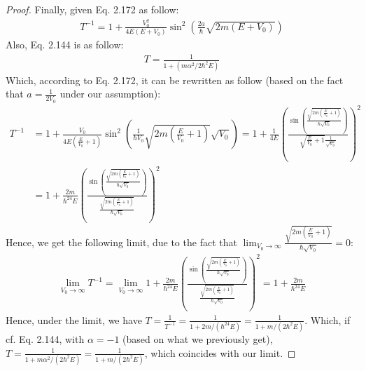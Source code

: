 \documentclass{article}
\begin{document}
\begin{proof}
    Finally, given Eq. 2.172 as follow:
    \begin{align}
        T^{-1}=1+\frac{V_0^2}{4E(E+V_0)}\sin^2\left(\frac{2a}{\hbar}\sqrt{2m(E+V_0)}\right)
    \end{align}
    Also, Eq. 2.144 is as follow:
    \begin{align}
        T=\frac{1}{1+(m\alpha^2/2\hbar^2E)}
    \end{align}
    Which, according to Eq. 2.172, it can be rewritten as follow (based on the fact that $a=\frac{1}{2V_0}$ under our assumption):
    \begin{align}
        T^{-1} &= 1+\frac{V_0}{4E(\frac{E}{V_0}+1)}\sin^2\left(\frac{1}{\hbar V_0}\sqrt{2m\left(\frac{E}{V_0}+1\right)}\sqrt{V_0}\right) = 1+\frac{1}{4E}\left(\frac{\sin\left(\frac{\sqrt{2m(\frac{E}{V_0}+1)}}{\hbar\sqrt{V_0}}\right)}{\sqrt{\frac{E}{V_0}+1}\frac{1}{\sqrt{V_0}}}\right)^2\\
        &= 1+\frac{2m}{\hbar^24E}\left(\frac{\sin\left(\frac{\sqrt{2m(\frac{E}{V_0}+1)}}{\hbar\sqrt{V_0}}\right)}{\frac{\sqrt{2m(\frac{E}{V_0}+1)}}{\hbar\sqrt{V_0}}}\right)^2
    \end{align}
    Hence, we get the following limit, due to the fact that $\lim_{V_0\rightarrow\infty}\frac{\sqrt{2m(\frac{E}{V_0}+1)}}{\hbar\sqrt{V_0}} = 0$:
    \begin{align}
        \lim_{V_0\rightarrow\infty}T^{-1}=\lim_{V_0\rightarrow\infty}1+\frac{2m}{\hbar^24E}\left(\frac{\sin\left(\frac{\sqrt{2m(\frac{E}{V_0}+1)}}{\hbar\sqrt{V_0}}\right)}{\frac{\sqrt{2m(\frac{E}{V_0}+1)}}{\hbar\sqrt{V_0}}}\right)^2 = 1+\frac{2m}{\hbar^24E}
    \end{align}
    Hence, under the limit, we have $T = \frac{1}{T^{-1}} = \frac{1}{1+2m/(\hbar^24E)} = \frac{1}{1+m/(2\hbar^2E)}$. Which, if cf. Eq. 2.144, with $\alpha=-1$ (based on what we previously get), $T=\frac{1}{1+m\alpha^2/(2\hbar^2E)} = \frac{1}{1+m/(2\hbar^2E)}$, which coincides with our limit.
\end{proof}

\newpage
\end{document}
